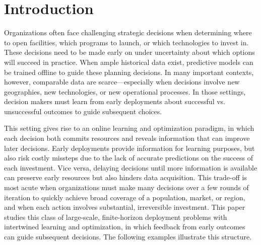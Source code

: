 \documentclass[blindrev]{informs3noheader}
\begin{document}
\vspace{-12pt}
\section{Introduction}

Organizations often face challenging strategic decisions when determining where to open facilities, which programs to launch, or which technologies to invest in. These decisions need to be made early on under uncertainty about which options will succeed in practice. When ample historical data exist, predictive models can be trained offline to guide these planning decisions. In many important contexts, however, comparable data are scarce—especially when decisions involve new geographies, new technologies, or new operational processes. In those settings, decision makers must learn from early deployments about successful vs. unsuccessful outcomes to guide subsequent choices.

This setting gives rise to an online learning and optimization paradigm, in which each decision both commits resources and reveals information that can improve later decisions. Early deployments provide information for learning purposes, but also risk costly missteps due to the lack of accurate predictions on the success of each investment. Vice versa, delaying decisions until more information is available can preserve early resources but also hinders data acquisition. This trade-off is most acute when organizations must make many decisions over a few rounds of iteration to quickly achieve broad coverage of a population, market, or region, and when each action involves substantial, irreversible investment. This paper studies this class of large-scale, finite-horizon deployment problems with intertwined learning and optimization, in which feedback from early outcomes can guide subsequent decisions. The following examples illustrate this structure.
\end{document}
